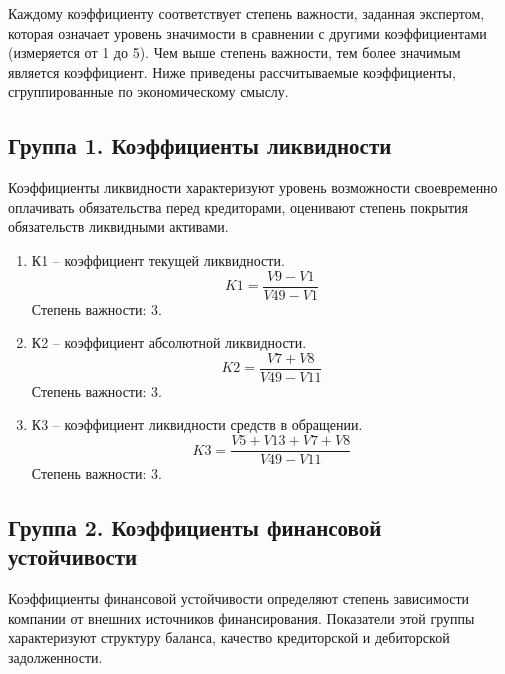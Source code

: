 \documentclass[14pt,a4paper]{extarticle}
\begin{document}
Каждому коэффициенту соответствует степень важности, заданная экспертом, которая означает уровень значимости в сравнении с другими коэффициентами (измеряется от 1 до 5). Чем выше степень важности, тем более значимым является коэффициент. Ниже приведены рассчитываемые коэффициенты, сгруппированные по экономическому смыслу.

\subsection*{Группа 1. Коэффициенты ликвидности}
Коэффициенты ликвидности характеризуют уровень возможности своевременно оплачивать обязательства перед кредиторами, оценивают степень покрытия обязательств ликвидными активами.

\begin{enumerate}
\item К1 – коэффициент текущей ликвидности.
\[
K1 = \frac{V9 - V1}{V49 - V1}
\]
Степень важности: 3.

\item К2 – коэффициент абсолютной ликвидности.
\[
K2 = \frac{V7 + V8}{V49 - V11}
\]
Степень важности: 3.

\item К3 – коэффициент ликвидности средств в обращении.
\[
K3 = \frac{V5 + V13 + V7 + V8}{V49 - V11}
\]
Степень важности: 3.
\end{enumerate}

\subsection*{Группа 2. Коэффициенты финансовой устойчивости}
Коэффициенты финансовой устойчивости определяют степень зависимости компании от внешних источников финансирования. Показатели этой группы характеризуют структуру баланса, качество кредиторской и дебиторской задолженности.
\end{document}
